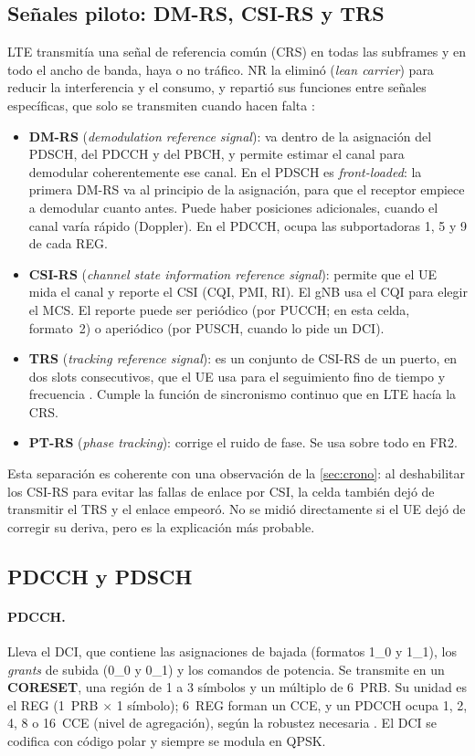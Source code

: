 \subsection{Señales piloto: DM-RS, CSI-RS y TRS}\label{sec:pilotos}
LTE transmitía una señal de referencia común (CRS) en todas las subframes y en todo el ancho de banda, haya o no tráfico. NR la eliminó (\emph{lean carrier}) para reducir la interferencia y el consumo, y repartió sus funciones entre señales específicas, que solo se transmiten cuando hacen falta \cite[§7.4.1]{ts38211}:
\begin{itemize}
  \item \textbf{DM-RS} (\emph{demodulation reference signal}): va dentro de la asignación del PDSCH, del PDCCH y del PBCH, y permite estimar el canal para demodular coherentemente ese canal. En el PDSCH es \emph{front-loaded}: la primera DM-RS va al principio de la asignación, para que el receptor empiece a demodular cuanto antes. Puede haber posiciones adicionales, cuando el canal varía rápido (Doppler). En el PDCCH, ocupa las subportadoras 1, 5 y 9 de cada REG.
  \item \textbf{CSI-RS} (\emph{channel state information reference signal}): permite que el UE mida el canal y reporte el CSI (CQI, PMI, RI). El gNB usa el CQI para elegir el MCS. El reporte puede ser periódico (por PUCCH; en esta celda, formato~2) o aperiódico (por PUSCH, cuando lo pide un DCI).
  \item \textbf{TRS} (\emph{tracking reference signal}): es un conjunto de CSI-RS de un puerto, en dos slots consecutivos, que el UE usa para el seguimiento fino de tiempo y frecuencia \cite[§5.1.6.1.1]{ts38214}. Cumple la función de sincronismo continuo que en LTE hacía la CRS.
  \item \textbf{PT-RS} (\emph{phase tracking}): corrige el ruido de fase. Se usa sobre todo en FR2.
\end{itemize}
Esta separación es coherente con una observación de la \cref{sec:crono}: al deshabilitar los CSI-RS para evitar las fallas de enlace por CSI, la celda también dejó de transmitir el TRS y el enlace empeoró. No se midió directamente si el UE dejó de corregir su deriva, pero es la explicación más probable.

\subsection{PDCCH y PDSCH}\label{sec:pdcch}
\paragraph{PDCCH.} Lleva el DCI, que contiene las asignaciones de bajada (formatos 1\_0 y 1\_1), los \emph{grants} de subida (0\_0 y 0\_1) y los comandos de potencia. Se transmite en un \textbf{CORESET}, una región de 1 a 3 símbolos y un múltiplo de 6~PRB. Su unidad es el REG (1~PRB $\times$ 1 símbolo); 6~REG forman un CCE, y un PDCCH ocupa 1, 2, 4, 8 o 16~CCE (nivel de agregación), según la robustez necesaria \cite[§7.3.2]{ts38211}. El DCI se codifica con código polar y siempre se modula en QPSK.

